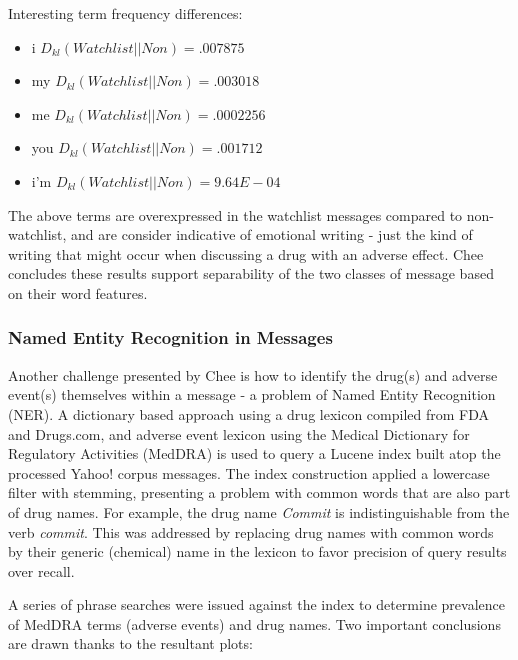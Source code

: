 \documentclass[twoside,11pt]{article}
\begin{document}
\begin{table}
  \caption{}
  \label{}

\end{table}
Interesting term frequency differences:
\begin{itemize}
  \item i $D_{kl}(Watchlist || Non) = .007875$
  \item my $D_{kl}(Watchlist || Non) = .003018$
  \item me $D_{kl}(Watchlist || Non) = .0002256$
  \item you $D_{kl}(Watchlist || Non) = .001712$
  \item i'm $D_{kl}(Watchlist || Non) = 9.64E-04$
\end{itemize}

The above terms are overexpressed in the watchlist messages compared to non-watchlist, and are consider indicative of emotional writing - just the kind of writing that might occur when discussing a drug with an adverse effect.  Chee concludes these results support separability of the two classes of message based on their word features.

\subsubsection{Named Entity Recognition in Messages}
Another challenge presented by Chee is how to identify the drug(s) and adverse event(s) themselves within a message - a problem of Named Entity Recognition (NER). A dictionary based approach using a drug lexicon compiled from FDA and Drugs.com, and adverse event lexicon using the Medical Dictionary for Regulatory Activities (MedDRA) is used to query a Lucene index built atop the processed Yahoo! corpus messages. The index construction applied a lowercase filter with stemming, presenting a problem with common words that are also part of drug names. For example, the drug name \textit{Commit} is indistinguishable from the verb \textit{commit}. This was addressed by replacing drug names with common words by their generic (chemical) name in the lexicon to favor precision of query results over recall.

A series of phrase searches were issued against the index to determine prevalence of MedDRA terms (adverse events) and drug names. Two important conclusions are drawn thanks to the resultant plots:
\end{document}
